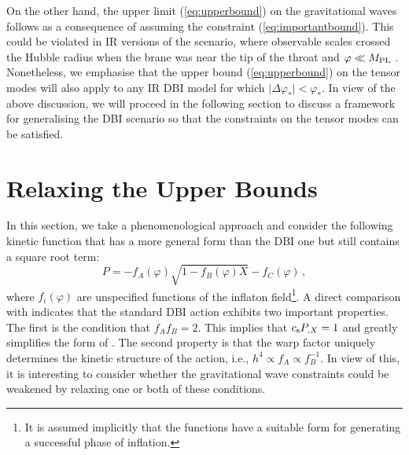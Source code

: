 On the other hand, 
the upper limit (\ref{eq:upperbound}) on the gravitational waves 
follows as a consequence of assuming 
the constraint (\ref{eq:importantbound}). This  
could be violated in IR versions of the scenario, where
observable scales crossed the Hubble radius when the 
brane was near the tip of the throat and $\varphi \ll M_{\mathrm{PL}}$
\cite{brane12,brane14}. 
Nonetheless, we emphasise that the upper bound (\ref{eq:upperbound})
on the tensor modes 
will also apply to any IR DBI model for which 
$|\Delta \varphi_* | < \varphi_*$.  
In view of the above discussion, 
we will proceed in the following section
to discuss a framework for generalising the DBI scenario so 
that the constraints on the tensor modes can be satisfied. 
% 
% 
% 
% 
\section{Relaxing the Upper Bounds}
% 
\label{sec:relaxing-dbi}
% 
In this section, we take a phenomenological 
approach and consider the following kinetic function that has a more general form than the DBI one
but still contains a square root term:
% 
\begin{equation}
\label{eq:genaction-dbi}
P= -f_A (\varphi ) \sqrt{1-f_B (\varphi ) X} -f_C (\varphi) \,,
\end{equation}
% 
where $f_i (\varphi )$ are unspecified functions of the inflaton 
field\footnote{It is assumed 
implicitly that the functions have a suitable form for 
generating a successful phase of inflation.}.
A direct comparison with  
indicates that the standard DBI action exhibits two important properties. 
The first is the condition that $f_A f_B =2$. This implies that 
$c_\mathrm{s} P_{,X} =1$ and greatly simplifies the form of . 
The second property is that the warp factor uniquely determines 
the kinetic structure of the action, i.e., $h^4 \propto f_A \propto f_B^{-1}$.  
In view of this, it is interesting to consider whether
the gravitational wave constraints could be weakened by relaxing one 
or both of these conditions. 


